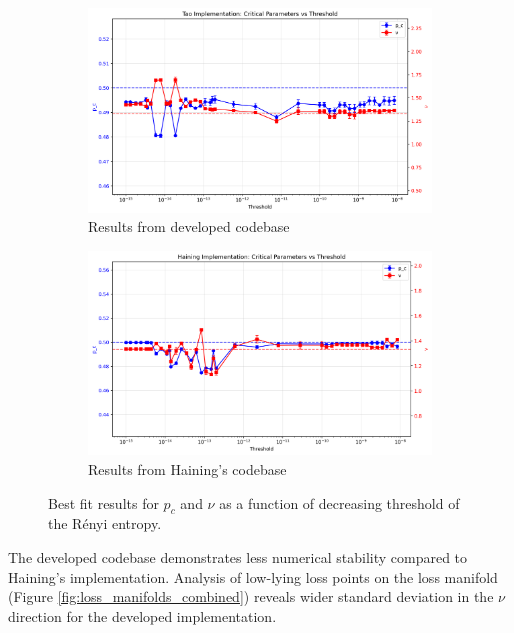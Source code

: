 \documentclass[11pt,a4paper]{article}
\begin{document}
\begin{figure}[H]
    \centering
    \begin{subfigure}[b]{0.48\linewidth}
        \centering
        \includegraphics[width=\linewidth]{threshold_dependence_tao.png}
        \caption{Results from developed codebase}
        \label{fig:p_nu_threshold_developed}
    \end{subfigure}
    \hfill
    \begin{subfigure}[b]{0.48\linewidth}
        \centering
        \includegraphics[width=\linewidth]{threshold_dependence_haining.png}
        \caption{Results from Haining's codebase}
        \label{fig:p_nu_threshold_haining}
    \end{subfigure}
    \caption{Best fit results for $p_c$ and $\nu$ as a function of decreasing threshold of the Rényi entropy.}
    \label{fig:p_nu_threshold_combined}
\end{figure}

The developed codebase demonstrates less numerical stability compared to Haining's implementation. Analysis of low-lying loss points on the loss manifold (Figure \ref{fig:loss_manifolds_combined}) reveals wider standard deviation in the $\nu$ direction for the developed implementation.
\end{document}
